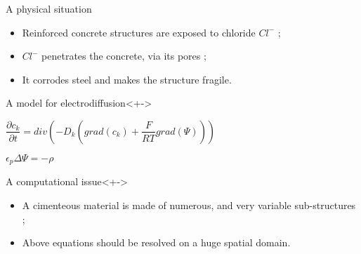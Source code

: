 
\begin{frame}
%
\begin{block}{A physical situation}
\begin{itemize}%
\item<+-> Reinforced concrete structures are exposed to chloride $Cl^-$ ;
\item<+-> $Cl^-$ penetrates the concrete, via its pores ;
\item<+-> It corrodes steel and makes the structure fragile.
\end{itemize}
\end{block}
%
\begin{block}{A model for electrodiffusion}<+->
\begin{description}
\item<+-> [The Nernst-Planck equation] $\dfrac{\partial{c_k}}{\partial{t}}=div\left(-D_k\left(grad(c_k)+\dfrac{F}{RT}grad(\Psi)\right)\right)$
\item<+-> [Poisson equation] $\epsilon_p \Delta \Psi=-\rho$
\end{description}
\end{block}
%
\begin{block}{A computational issue}<+->
\begin{itemize}
\item<+-> A cimenteous material is made of numerous, and very variable sub-structures ;
\item<+-> Above equations should be resolved on a huge spatial domain.
\end{itemize}
\end{block}
%
\end{frame}

